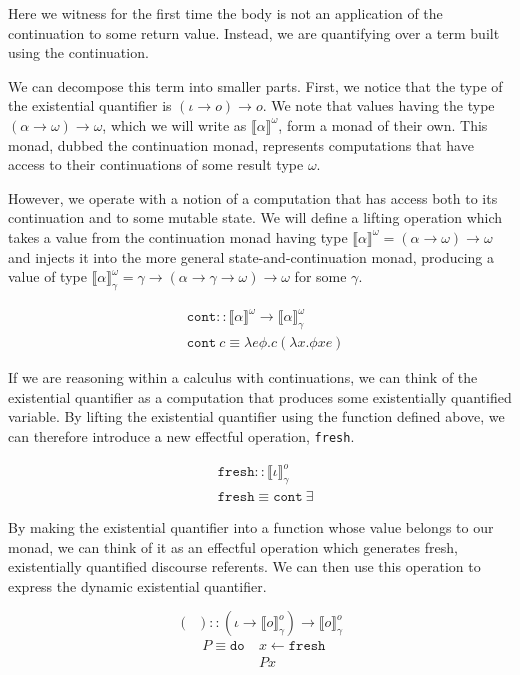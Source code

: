 \documentclass{article}
\newcommand{\dexists}{\mathop{\bar{\exists}}}
\newcommand{\statecps}[3]{\llbracket #3 \rrbracket^{#2}_{#1}}
\newcommand{\cps}[2]{\llbracket #2 \rrbracket^{#1}}
\begin{document}
Here we witness for the first time the body is not an application of the
continuation to some return value. Instead, we are quantifying over a term
built using the continuation.

We can decompose this term into smaller parts. First, we notice that the type
of the existential quantifier is $(\iota \to o) \to o$. We note that values
having the type $(\alpha \to \omega) \to \omega$, which we will write as
$\cps{\omega}{\alpha}$, form a monad of their own. This monad, dubbed the
continuation monad, represents computations that have access to their
continuations of some result type $\omega$.

However, we operate with a notion of a computation that has access both to its
continuation and to some mutable state. We will define a lifting operation
which takes a value from the continuation monad having type
$\cps{\omega}{\alpha} = (\alpha \to \omega) \to \omega$ and injects it into
the more general state-and-continuation monad, producing a value of type
$\statecps{\gamma}{\omega}{\alpha} = \gamma \to (\alpha \to \gamma \to \omega)
\to \omega$ for some $\gamma$.

\begin{align*}
& \texttt{cont} :: \cps{\omega}{\alpha} \to \statecps{\gamma}{\omega}{\alpha} \\
& \texttt{cont}\ c \equiv \lambda e \phi. c (\lambda x. \phi x e)
\end{align*}

If we are reasoning within a calculus with continuations, we can think of the
existential quantifier as a computation that produces some existentially
quantified variable. By lifting the existential quantifier using the function
defined above, we can therefore introduce a new effectful operation,
\texttt{fresh}.

\begin{align*}
& \texttt{fresh} :: \statecps{\gamma}{o}{\iota} \\
& \texttt{fresh} \equiv \texttt{cont}\ \exists
\end{align*}

By making the existential quantifier into a function whose value belongs to
our monad, we can think of it as an effectful operation which generates fresh,
existentially quantified discourse referents. We can then use this operation
to express the dynamic existential quantifier.

$$
(\dexists) :: (\iota \to \statecps{\gamma}{o}{o}) \to \statecps{\gamma}{o}{o}
$$
\vspace{-2em}
\begin{align*}
\dexists P \equiv \texttt{do}\ & x \gets \texttt{fresh} \\
                               & P x
\end{align*}
\end{document}
